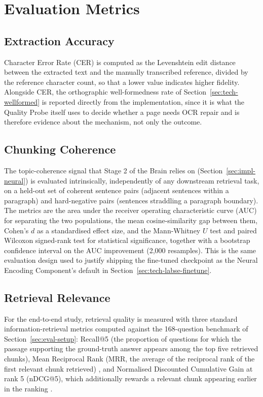 \documentclass[12pt,a4paper,oneside]{report}
\begin{document}
\section{Evaluation Metrics}
\label{sec:eval-metrics}

\subsection{Extraction Accuracy}
Character Error Rate (CER) is computed as the Levenshtein edit distance between the extracted text and the manually transcribed reference, divided by the reference character count, so that a lower value indicates higher fidelity. Alongside CER, the orthographic well-formedness rate of Section~\ref{sec:tech-wellformed} is reported directly from the implementation, since it is what the Quality Probe itself uses to decide whether a page needs OCR repair and is therefore evidence about the mechanism, not only the outcome.

\subsection{Chunking Coherence}
\label{sec:eval-metrics-coherence}
The topic-coherence signal that Stage 2 of the Brain relies on (Section~\ref{sec:impl-neural}) is evaluated intrinsically, independently of any downstream retrieval task, on a held-out set of coherent sentence pairs (adjacent sentences within a paragraph) and hard-negative pairs (sentences straddling a paragraph boundary). The metrics are the area under the receiver operating characteristic curve (AUC) for separating the two populations, the mean cosine-similarity gap between them, Cohen's $d$ as a standardised effect size, and the Mann-Whitney $U$ test and paired Wilcoxon signed-rank test for statistical significance, together with a bootstrap confidence interval on the AUC improvement (2{,}000 resamples). This is the same evaluation design used to justify shipping the fine-tuned checkpoint as the Neural Encoding Component's default in Section~\ref{sec:tech-labse-finetune}.

\subsection{Retrieval Relevance}
For the end-to-end study, retrieval quality is measured with three standard information-retrieval metrics computed against the 168-question benchmark of Section~\ref{sec:eval-setup}: Recall@5 (the proportion of questions for which the passage supporting the ground-truth answer appears among the top five retrieved chunks), Mean Reciprocal Rank (MRR, the average of the reciprocal rank of the first relevant chunk retrieved) \cite{voorhees1999trec8qa}, and Normalised Discounted Cumulative Gain at rank 5 (nDCG@5), which additionally rewards a relevant chunk appearing earlier in the ranking \cite{jarvelin2002ndcg}.
\end{document}
